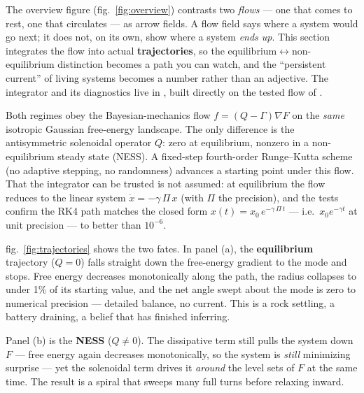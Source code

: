 \documentclass[
  english,
]{article}
\begin{document}
The overview figure (fig.~\ref{fig:overview}) contrasts two \emph{flows}
--- one that comes to rest, one that circulates --- as arrow fields. A
flow field says where a system would go next; it does not, on its own,
show where a system \emph{ends up}. This section integrates the flow
into actual \textbf{trajectories}, so the equilibrium\texorpdfstring{\ensuremath{\leftrightarrow}}{<->}non-equilibrium
distinction becomes a path you can watch, and the ``persistent current''
of living systems becomes a number rather than an adjective. The
integrator and its diagnostics live in ,
built directly on the tested flow of .

Both regimes obey the Bayesian-mechanics flow
\(f = (Q - \Gamma)\nabla F\) on the \emph{same} isotropic Gaussian
free-energy landscape. The only difference is the antisymmetric
solenoidal operator \(Q\): zero at equilibrium, nonzero in a
non-equilibrium steady state (NESS). A fixed-step fourth-order
Runge--Kutta scheme (no adaptive stepping, no randomness) advances a
starting point under this flow. That the integrator can be trusted is
not assumed: at equilibrium the flow reduces to the linear system
\(\dot{x} = -\gamma\,\Pi\,x\) (with \(\Pi\) the precision), and the
tests confirm the RK4 path matches the closed form
\(x(t) = x_0\,e^{-\gamma\,\Pi\,t}\) --- i.e.~\(x_0 e^{-\gamma t}\) at
unit precision --- to better than \(10^{-6}\).

fig.~\ref{fig:trajectories} shows the two fates. In panel (a), the
\textbf{equilibrium} trajectory (\(Q = 0\)) falls straight down the
free-energy gradient to the mode and stops. Free energy decreases
monotonically along the path, the radius collapses to under 1\% of its
starting value, and the net angle swept about the mode is zero to
numerical precision --- detailed balance, no current. This is a rock
settling, a battery draining, a belief that has finished inferring.

Panel (b) is the \textbf{NESS} (\(Q \neq 0\)). The dissipative term
still pulls the system down \(F\) --- free energy again decreases
monotonically, so the system is \emph{still} minimizing surprise --- yet
the solenoidal term drives it \emph{around} the level sets of \(F\) at
the same time. The result is a spiral that sweeps many full turns before
relaxing inward.
\end{document}
